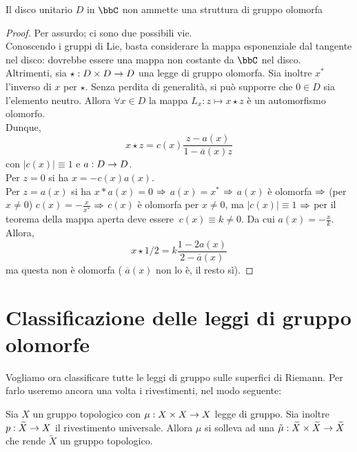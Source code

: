 \begin{teorema}
Il disco unitario $D$ in $\bbC$ non ammette una struttura di gruppo olomorfa
\end{teorema}

\begin{proof}
Per assurdo; ci sono due possibili vie.\\
Conoscendo i gruppi di Lie, basta considerare la mappa esponenziale dal tangente nel disco: dovrebbe essere una mappa non costante da $\bbC$ nel disco. \hfill \Lightning \\
Altrimenti, sia $\star : D\times D \rightarrow D$ una legge di gruppo olomorfa. Sia inoltre $x^{*}$ l'inverso di $x$ per $\star$. Senza perdita di generalità, si può supporre che $0 \in D$ sia l'elemento neutro.
Allora $\forall x\in D$ la mappa $L_{x}: z\mapsto x\star z$ è un automorfismo olomorfo. \\
Dunque,  $$x\star z = c(x)\frac{z -a(x)}{1- \overline{a}(x) z}$$
con $|c(x)|\equiv 1$ e $a:D \rightarrow D$.\\
Per $z=0$ si ha $x=-c(x)a(x)$.\\
Per $z=a(x)$ si ha $x*a(x)=0$ $\Rightarrow$ $a(x)=x^{*}$ $\Rightarrow$ $a(x)$ è olomorfa $\Rightarrow$ (per $x\neq 0$) $c(x)=-\frac{x}{x^{*}}$ $\Rightarrow$ $c(x)$ è olomorfa per $x\neq 0$, ma $|c(x)| \equiv 1$ $\Rightarrow$ per il teorema della mappa aperta deve essere $ \ c(x) \equiv k \neq 0$. Da cui $a(x)= -\frac{x}{k}$.\\
Allora, $$x\star 1/2 = k\frac{1-2a(x)}{2-\overline{a}(x)}$$
ma questa non è olomorfa ( $\overline{a}(x)$ non lo è, il resto sì).

\end{proof}

\section{Classificazione delle leggi di gruppo olomorfe}
Vogliamo ora classificare tutte le leggi di gruppo sulle superfici di Riemann. Per farlo useremo ancora una volta i rivestimenti, nel modo seguente:

\begin{lemma}
Sia $X$ un gruppo topologico con $\mu : X\times X \rightarrow X$ legge di gruppo. Sia inoltre $p :\widetilde{X} \rightarrow X$ il rivestimento universale.
Allora $\mu$ si solleva ad una $\tilde{\mu} : \widetilde{X} \times \widetilde{X} \rightarrow \widetilde{X}$ che rende $\widetilde{X}$ un gruppo topologico.
\end{lemma}

